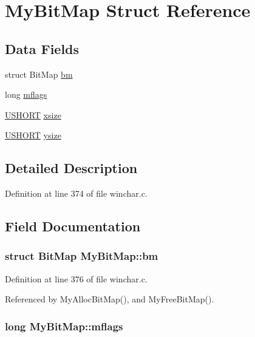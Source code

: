 \hypertarget{structMyBitMap}{\section{My\+Bit\+Map Struct Reference}
\label{structMyBitMap}
}
\subsection*{Data Fields}
\begin{DoxyCompactItemize}
\item 
struct Bit\+Map \hyperlink{structMyBitMap_ad2c6c7c024d298033aad2a8dbf26da1b}{bm}
\item 
long \hyperlink{structMyBitMap_a1ee0fa498c5e87c84bf505dd1122272f}{mflags}
\item 
\hyperlink{def__os2_8h_a5850d5316caf7f4cedd742fdf8cd7c02}{U\+S\+H\+O\+R\+T} \hyperlink{structMyBitMap_ae0804d602af334c249af60c59ba5422e}{xsize}
\item 
\hyperlink{def__os2_8h_a5850d5316caf7f4cedd742fdf8cd7c02}{U\+S\+H\+O\+R\+T} \hyperlink{structMyBitMap_aae7794695e54b85bbe7f276e290d5455}{ysize}
\end{DoxyCompactItemize}


\subsection{Detailed Description}


Definition at line 374 of file winchar.\+c.



\subsection{Field Documentation}
\hypertarget{structMyBitMap_ad2c6c7c024d298033aad2a8dbf26da1b}{
\subsubsection[{bm}]{\setlength{\rightskip}{0pt plus 5cm}struct Bit\+Map My\+Bit\+Map\+::bm}}\label{structMyBitMap_ad2c6c7c024d298033aad2a8dbf26da1b}


Definition at line 376 of file winchar.\+c.



Referenced by My\+Alloc\+Bit\+Map(), and My\+Free\+Bit\+Map().

\hypertarget{structMyBitMap_a1ee0fa498c5e87c84bf505dd1122272f}{
\subsubsection[{mflags}]{\setlength{\rightskip}{0pt plus 5cm}long My\+Bit\+Map\+::mflags}}\label{structMyBitMap_a1ee0fa498c5e87c84bf505dd1122272f}


